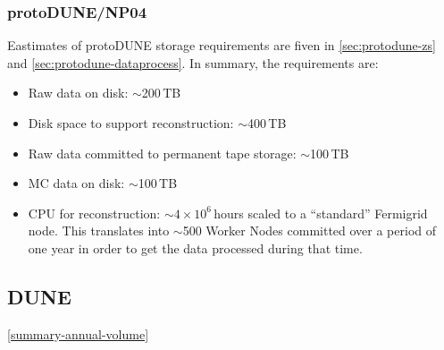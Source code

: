 \subsubsection{protoDUNE/NP04}
Eastimates of protoDUNE storage requirements are fiven in \ref{sec:protodune-zs} and \ref{sec:protodune-dataprocess}.
In summary, the requirements are:
\begin{itemize}

\item Raw data on disk: $\sim$200\,TB

\item Disk space to support reconstruction: $\sim$400\,TB

\item Raw data committed to permanent tape storage: $\sim$100\,TB

\item MC data on disk: $\sim$100\,TB

\item CPU for reconstruction: $\sim4\times10^6$\,hours scaled to a ``standard'' Fermigrid node. This translates into $\sim$500 Worker Nodes
committed over a period of one year in order to get the data processed during that time.

\end{itemize}

\subsection{DUNE}
\ref{summary-annual-volume}
